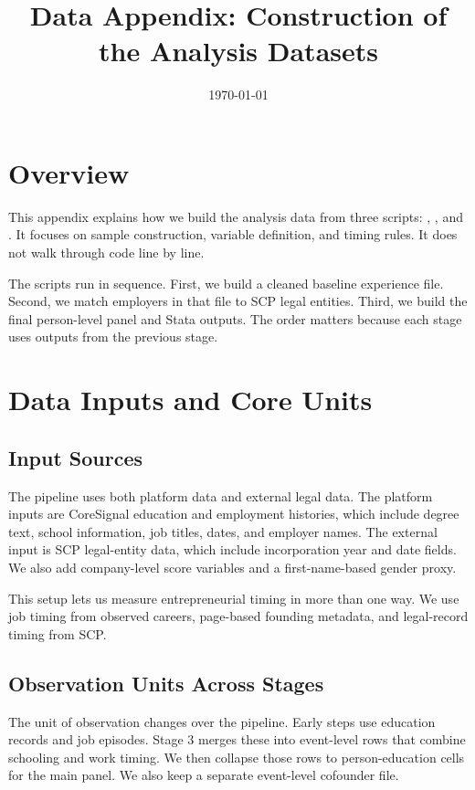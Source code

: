 \documentclass[12pt]{article}
\title{Data Appendix: Construction of the Analysis Datasets}
\author{}
\date{\today}
\begin{document}
\maketitle

\section{Overview}

This appendix explains how we build the analysis data from three scripts: , , and . It focuses on sample construction, variable definition, and timing rules. It does not walk through code line by line.

The scripts run in sequence. First, we build a cleaned baseline experience file. Second, we match employers in that file to SCP legal entities. Third, we build the final person-level panel and Stata outputs. The order matters because each stage uses outputs from the previous stage.

\section{Data Inputs and Core Units}

\subsection{Input Sources}

The pipeline uses both platform data and external legal data. The platform inputs are CoreSignal education and employment histories, which include degree text, school information, job titles, dates, and employer names. The external input is SCP legal-entity data, which include incorporation year and date fields. We also add company-level score variables and a first-name-based gender proxy.

This setup lets us measure entrepreneurial timing in more than one way. We use job timing from observed careers, page-based founding metadata, and legal-record timing from SCP.

\subsection{Observation Units Across Stages}

The unit of observation changes over the pipeline. Early steps use education records and job episodes. Stage 3 merges these into event-level rows that combine schooling and work timing. We then collapse those rows to person-education cells for the main panel. We also keep a separate event-level cofounder file.
\end{document}
